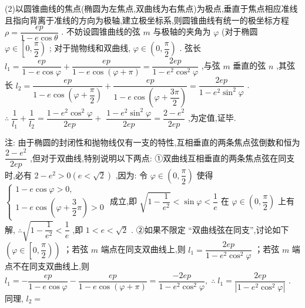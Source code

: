 (2)以圆锥曲线的焦点(椭圆为左焦点,双曲线为右焦点)为极点,垂直于焦点相应准线且指向背离于准线的方向为极轴,建立极坐标系,则圆锥曲线有统一的极坐标方程 $\rho  = \dfrac{ep}{1 - e\cos \theta }$ . 不妨设圆锥曲线的弦 $m$ 与极轴的夹角为 $\varphi$ (对于椭圆 $\varphi  \in  \left\lbrack  {0,\dfrac{\pi }{2}}\right)$ ; 对于抛物线和双曲线, $\varphi  \in  \left( {0,\dfrac{\pi }{2}}\right)$ . 弦长 ${l}_{1} = \dfrac{ep}{1 - e\cos \varphi } + \dfrac{ep}{1 - e\cos \left( {\varphi  + \pi }\right) } = \dfrac{2ep}{1 - {e}^{2}{\cos }^{2}\varphi }$ ,与弦 $m$ 垂直的弦 $n$ ,其弦长 ${l}_{2} = \dfrac{ep}{1 - e\cos \left( {\varphi  + \dfrac{\pi }{2}}\right) } + \dfrac{ep}{1 - e\cos \left( {\varphi  + \dfrac{3\pi }{2}}\right) } = \dfrac{2ep}{1 - {e}^{2}{\sin }^{2}\varphi }$ . $\therefore \;\dfrac{1}{{l}_{1}} + \dfrac{1}{{l}_{2}} = \dfrac{1 - {e}^{2}{\cos }^{2}\varphi }{2ep} +$  $\dfrac{1 - {e}^{2}{\sin }^{2}\varphi }{2ep} = \dfrac{2 - {e}^{2}}{2ep}$ ,为定值,证毕.

注: 由于椭圆的封闭性和抛物线仅有一支的特性,互相垂直的两条焦点弦倒数和恒为 $\dfrac{2 - {e}^{2}}{2ep}$ ,但对于双曲线,特别说明以下两点: ①双曲线互相垂直的两条焦点弦在同支时,必有 $2 - {e}^{2} > 0\left( {e < \sqrt{2}}\right)$ ,因为: 令 $\varphi  \in  \left( {0,\dfrac{\pi }{2}}\right)$ 使得 $\left\{  \begin{array}{l} 1 - e\cos \varphi  > 0, \\  1 - e\cos \left( {\varphi  + \dfrac{3}{2}\pi }\right)  > 0 \end{array}\right.$ 成立,即 $\sqrt{1 - \dfrac{1}{{e}^{2}}} < \sin \varphi  < \dfrac{1}{e}$ 在 $\varphi  \in  \left( {0,\dfrac{\pi }{2}}\right)$ 上有解, $\therefore \sqrt{1 - \dfrac{1}{{e}^{2}}} < \dfrac{1}{e}$ ,即 $1 < e < \sqrt{2}$ . ②如果不限定 “双曲线弦在同支”,讨论如下 $\left( {\varphi  \in  \left\lbrack  {0,\dfrac{\pi }{2}}\right) }\right)$ ；若弦 $m$ 端点在同支双曲线上,则 ${l}_{1} = \dfrac{2ep}{1 - {e}^{2}{\cos }^{2}\varphi }$ ；若弦 $m$ 端点不在同支双曲线上,则 ${l}_{1} =  - \dfrac{ep}{1 - e\cos \varphi } - \dfrac{ep}{1 - e\cos \left( {\varphi  + \pi }\right) } = \dfrac{-{2ep}}{1 - {e}^{2}{\cos }^{2}\varphi },\;\therefore \;{l}_{1} = \dfrac{2ep}{\left| 1 - {e}^{2}{\cos }^{2}\varphi \right| }$ . 同理, ${l}_{2} =$

